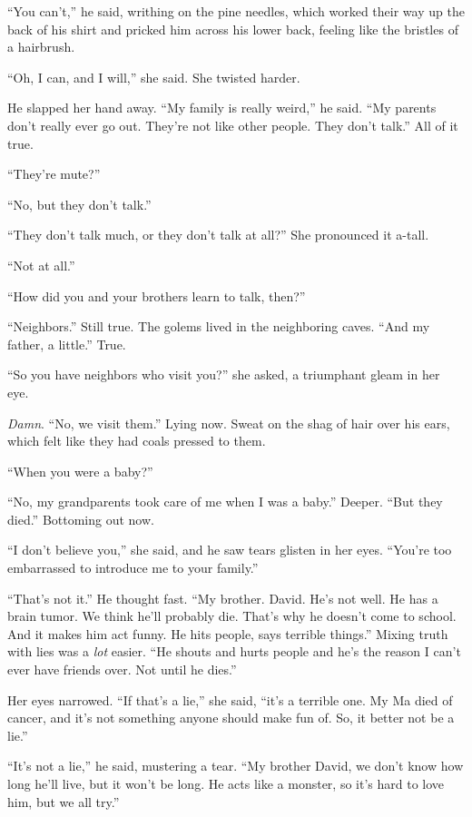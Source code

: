 \documentclass{article}
\begin{document}
``You can't,'' he said, writhing on the pine needles, which worked
their way up the back of his shirt and pricked him across his lower
back, feeling like the bristles of a hairbrush.

``Oh, I can, and I will,'' she said.  She twisted harder.

He slapped her hand away.  ``My family is really weird,'' he said. 
``My parents don't really ever go out.  They're not like other people. 
They don't talk.'' All of it true.

``They're mute?''

``No, but they don't talk.''

``They don't talk much, or they don't talk at all?'' She pronounced it
a-tall.

``Not at all.''

``How did you and your brothers learn to talk, then?''

``Neighbors.'' Still true.  The golems lived in the neighboring caves. 
``And my father, a little.'' True.

``So you have neighbors who visit you?'' she asked, a triumphant gleam
in her eye.

\textit{Damn}.  ``No, we visit them.'' Lying now.  Sweat on the shag
of hair over his ears, which felt like they had coals pressed to them.

``When you were a baby?''

``No, my grandparents took care of me when I was a baby.'' Deeper. 
``But they died.'' Bottoming out now.

``I don't believe you,'' she said, and he saw tears glisten in her
eyes.  ``You're too embarrassed to introduce me to your family.''

``That's not it.'' He thought fast.  ``My brother.  David.  He's not
well.  He has a brain tumor.  We think he'll probably die.  That's why
he doesn't come to school.  And it makes him act funny.  He hits
people, says terrible things.'' Mixing truth with lies was a
\textit{lot} easier.  ``He shouts and hurts people and he's the reason
I can't ever have friends over.  Not until he dies.''

Her eyes narrowed.  ``If that's a lie,'' she said, ``it's a terrible
one.  My Ma died of cancer, and it's not something anyone should make
fun of.  So, it better not be a lie.''

``It's not a lie,'' he said, mustering a tear.  ``My brother David, we
don't know how long he'll live, but it won't be long.  He acts like a
monster, so it's hard to love him, but we all try.''
\end{document}
